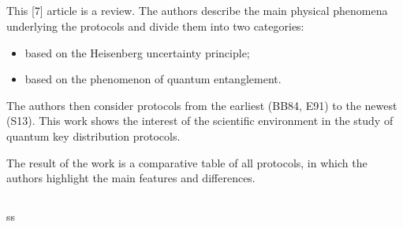 \subsection{\review}
This [7] article is a review. The authors describe the main physical phenomena underlying the protocols and divide them into two categories:
\begin{itemize}
	\item based on the Heisenberg uncertainty principle;
	\item based on the phenomenon of quantum entanglement.
\end{itemize}

The authors then consider protocols from the earliest (BB84, E91) to the newest (S13). This work shows the interest of the scientific environment in the study of quantum key distribution protocols.

The result of the work is a comparative table of all protocols, in which the authors highlight the main features and differences.


\subsection{\dic}
ss